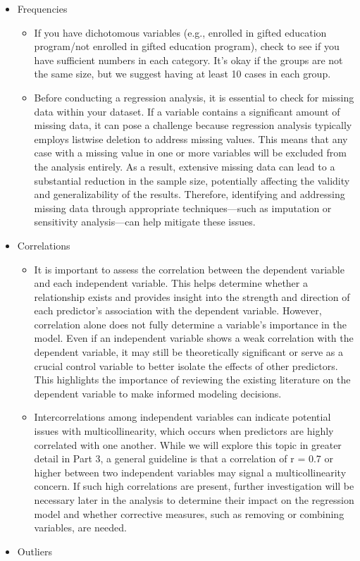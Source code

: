 \documentclass[
  letterpaper,
  DIV=11,
  numbers=noendperiod]{scrreprt}
\begin{document}
\begin{itemize}
\item
  Frequencies\,

  \begin{itemize}
  \item
    If you have dichotomous variables (e.g., enrolled in gifted
    education program/not enrolled in gifted education program), check
    to see if you have sufficient numbers in each category. It's okay if
    the groups are not the same size, but we suggest having at least 10
    cases in each group.\,\,
  \item
    Before conducting a regression analysis, it is essential to check
    for missing data within your dataset. If a variable contains a
    significant amount of missing data, it can pose a challenge because
    regression analysis typically employs listwise deletion to address
    missing values. This means that any case with a missing value in one
    or more variables will be excluded from the analysis entirely. As a
    result, extensive missing data can lead to a substantial reduction
    in the sample size, potentially affecting the validity and
    generalizability of the results. Therefore, identifying and
    addressing missing data through appropriate techniques---such as
    imputation or sensitivity analysis---can help mitigate these issues.
  \end{itemize}
\item
  Correlations\,

  \begin{itemize}
  \item
    It is important to assess the correlation between the dependent
    variable and each independent variable. This helps determine whether
    a relationship exists and provides insight into the strength and
    direction of each predictor's association with the dependent
    variable. However, correlation alone does not fully determine a
    variable's importance in the model. Even if an independent variable
    shows a weak correlation with the dependent variable, it may still
    be theoretically significant or serve as a crucial control variable
    to better isolate the effects of other predictors. This highlights
    the importance of reviewing the existing literature on the dependent
    variable to make informed modeling decisions.
  \item
    Intercorrelations among independent variables can indicate potential
    issues with multicollinearity, which occurs when predictors are
    highly correlated with one another. While we will explore this topic
    in greater detail in Part 3, a general guideline is that a
    correlation of r = 0.7 or higher between two independent variables
    may signal a multicollinearity concern. If such high correlations
    are present, further investigation will be necessary later in the
    analysis to determine their impact on the regression model and
    whether corrective measures, such as removing or combining
    variables, are needed.
  \end{itemize}
\item
  Outliers


\end{itemize}
\end{document}
